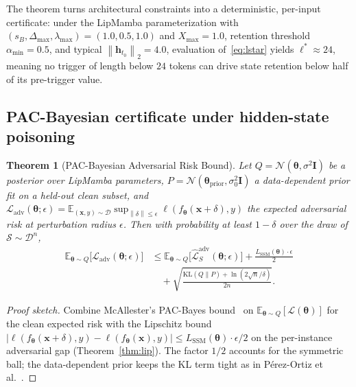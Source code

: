 \documentclass[journal,a4paper,10pt]{IEEEtran}
\newtheorem{theorem}{Theorem}
\theoremstyle{definition}
\theoremstyle{remark}
\newcommand{\modelname}{LipMamba}
\newcommand{\E}{\mathbb{E}}
\newcommand{\Lcal}{\mathcal{L}}
\newcommand{\Dcal}{\mathcal{D}}
\newcommand{\Scal}{\mathcal{S}}
\newcommand{\Ncal}{\mathcal{N}}
\newcommand{\KL}{\mathrm{KL}}
\newcommand{\norm}[1]{\left\|#1\right\|}
\begin{document}
The theorem turns architectural constraints into a deterministic, per-input certificate: under the \modelname{} parameterization with $(s_B, \Delta_{\max}, \lambda_{\max}) = (1.0, 0.5, 1.0)$ and $X_{\max} = 1.0$, retention threshold $\alpha_{\min} = 0.5$, and typical $\norm{\mathbf{h}_{t_0}}_2 = 4.0$, evaluation of~\eqref{eq:lstar} yields $\ell^* \approx 24$, meaning no trigger of length below $24$ tokens can drive state retention below half of its pre-trigger value.

\subsection{PAC-Bayesian certificate under hidden-state poisoning}

\begin{theorem}[PAC-Bayesian Adversarial Risk Bound]
\label{thm:pacbayes}
Let $Q = \Ncal(\bm{\theta}, \sigma^2 \mathbf{I})$ be a posterior over \modelname{} parameters, $P = \Ncal(\bm{\theta}_{\mathrm{prior}}, \sigma_0^2 \mathbf{I})$ a data-dependent prior fit on a held-out clean subset, and $\Lcal_{\mathrm{adv}}(\bm{\theta}; \epsilon) = \E_{(\mathbf{x},y) \sim \Dcal} \sup_{\norm{\delta} \leq \epsilon} \ell(f_{\bm{\theta}}(\mathbf{x} + \delta), y)$ the expected adversarial risk at perturbation radius $\epsilon$. Then with probability at least $1 - \delta$ over the draw of $\Scal \sim \Dcal^n$,
\begin{align}
    \E_{\bm{\theta} \sim Q}\bigl[\Lcal_{\mathrm{adv}}(\bm{\theta}; \epsilon)\bigr]
    &\leq \E_{\bm{\theta} \sim Q}\bigl[\hat{\Lcal}_S^{\mathrm{adv}}(\bm{\theta}; \epsilon)\bigr]
    + \frac{L_{\mathrm{SSM}}(\bm{\theta}) \cdot \epsilon}{2} \nonumber\\
    &\quad + \sqrt{\frac{\KL(Q \| P) + \ln(2\sqrt{n}/\delta)}{2 n}}.
    \label{eq:pacbayes}
\end{align}
\end{theorem}

\begin{proof}[Proof sketch]
Combine McAllester's PAC-Bayes bound~\cite{mcallester2003pac,perezortiz2021tighter} on $\E_{\bm{\theta} \sim Q}[\Lcal(\bm{\theta})]$ for the clean expected risk with the Lipschitz bound $|\ell(f_{\bm{\theta}}(\mathbf{x} + \delta), y) - \ell(f_{\bm{\theta}}(\mathbf{x}), y)| \leq L_{\mathrm{SSM}}(\bm{\theta}) \cdot \epsilon / 2$ on the per-instance adversarial gap (Theorem~\ref{thm:lip}). The factor $1/2$ accounts for the symmetric ball; the data-dependent prior keeps the KL term tight as in Pérez-Ortiz et al.~\cite{perezortiz2021tighter}.
\end{proof}
\end{document}
